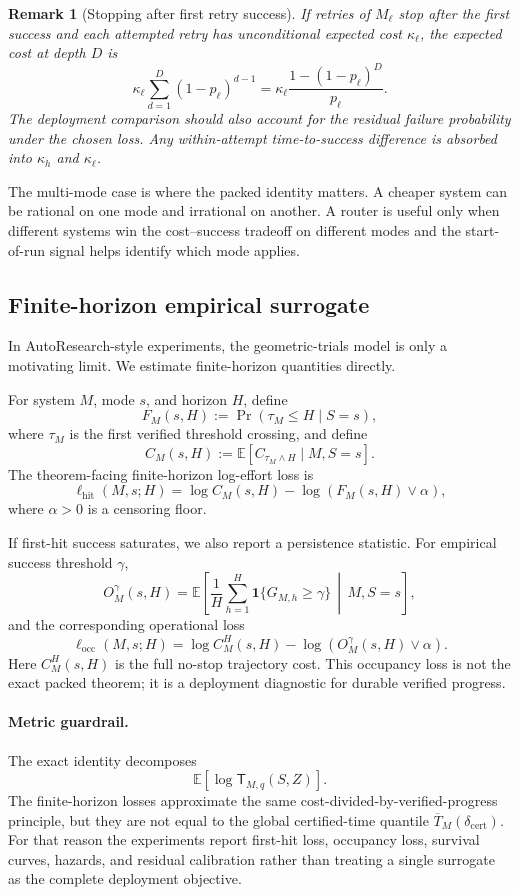 \documentclass{article}
\newtheorem{remark}{Remark}
\newcommand{\E}{\mathbb{E}}
\newcommand{\one}{\mathbf{1}}
\begin{document}
\begin{remark}[Stopping after first retry success]
If retries of \(M_\ell\) stop after the first success and each attempted retry has
unconditional expected cost \(\kappa_\ell\), the expected cost at depth \(D\) is
\[
    \kappa_\ell
    \sum_{d=1}^{D}(1-p_\ell)^{d-1}
    =
    \kappa_\ell\frac{1-(1-p_\ell)^D}{p_\ell}.
\]
The deployment comparison should also account for the residual failure probability under
the chosen loss.  Any within-attempt time-to-success difference is absorbed into
\(\kappa_h\) and \(\kappa_\ell\).
\end{remark}

The multi-mode case is where the packed identity matters.  A cheaper system can be
rational on one mode and irrational on another.  A router is useful only when different
systems win the cost--success tradeoff on different modes and the start-of-run signal helps
identify which mode applies.



\subsection{Finite-horizon empirical surrogate}

In AutoResearch-style experiments, the geometric-trials model is only a motivating limit.
We estimate finite-horizon quantities directly.

For system \(M\), mode \(s\), and horizon \(H\), define
\[
    F_M(s,H):=\Pr(\tau_M\le H\mid S=s),
\]
where \(\tau_M\) is the first verified threshold crossing, and define
\[
    C_M(s,H):=\E[C_{\tau_M\wedge H}\mid M,S=s].
\]
The theorem-facing finite-horizon log-effort loss is
\[
    \ell_{\mathrm{hit}}(M,s;H)
    =
    \log C_M(s,H)-\log(F_M(s,H)\vee\alpha),
\]
where \(\alpha>0\) is a censoring floor.

If first-hit success saturates, we also report a persistence statistic.  For empirical
success threshold \(\gamma\),
\[
    O_M^\gamma(s,H)
    =
    \E\left[
        \frac1H\sum_{h=1}^H
        \one\{G_{M,h}\ge\gamma\}
        \,\middle|\,
        M,S=s
    \right],
\]
and the corresponding operational loss
\[
    \ell_{\mathrm{occ}}(M,s;H)
    =
    \log C_M^H(s,H)-\log(O_M^\gamma(s,H)\vee\alpha).
\]
Here \(C_M^H(s,H)\) is the full no-stop trajectory cost.
This occupancy loss is not the exact packed theorem; it is a deployment diagnostic for
durable verified progress.

\paragraph{Metric guardrail.}
The exact identity decomposes
\[
    \E[\log \mathsf T_{M,q}(S,Z)].
\]
The finite-horizon losses approximate the same cost-divided-by-verified-progress principle,
but they are not equal to the global certified-time quantile
\(\overline T_M(\delta_{\mathrm{cert}})\).
For that reason the experiments report first-hit loss, occupancy loss, survival curves,
hazards, and residual calibration rather than treating a single surrogate as the complete
deployment objective.
\end{document}
